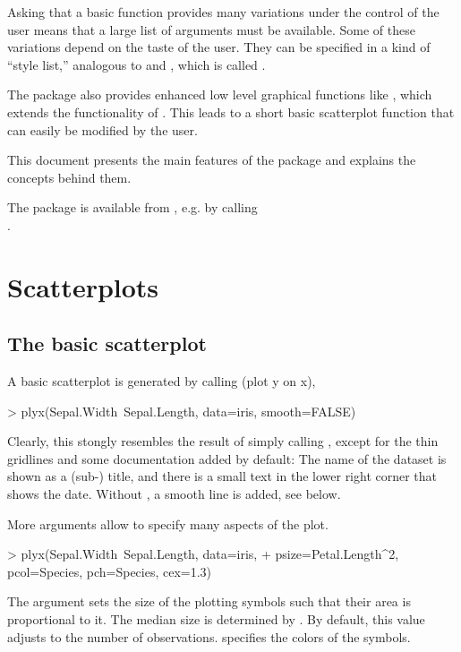 \documentclass[11pt]{article}
\begin{document}
Asking that a basic function provides many variations under the control of
the user means that a large list of arguments must be available.
Some of these variations depend on the taste of the user. 
They can be specified in a kind of ``style list,'' analogous to 
 and , which is called .

The package also provides enhanced low level graphical functions
like , which extends the functionality of .
This leads to a short basic scatterplot function  that can
easily be modified by the user.

This document presents the main features of the package 
and explains the concepts behind them. 

The package is available from , e.g. by calling\\
.\\

\section{Scatterplots}

\subsection{The basic scatterplot}
A basic scatterplot is generated by calling 
(plot y on x),
\begin{Schunk}
\begin{Sinput}
> plyx(Sepal.Width~Sepal.Length, data=iris, smooth=FALSE)
\end{Sinput}
\end{Schunk}
Clearly, this stongly resembles the result of simply calling , 
except for the thin gridlines and some documentation added by default: 
The name of the dataset is shown as a (sub-) title, and there is a small
text in the lower right corner that shows the date.
Without , a smooth line is added, see below.

More arguments allow to specify many aspects of the plot.
\begin{Schunk}
\begin{Sinput}
> plyx(Sepal.Width~Sepal.Length, data=iris, 
+      psize=Petal.Length^2, pcol=Species, pch=Species, cex=1.3)
\end{Sinput}
\end{Schunk}
The argument  sets the size of the plotting symbols
such that their area is proportional to it.
The median size is determined by .
By default, this value adjusts to the number of observations.
 specifies the colors of the symbols.
\end{document}
